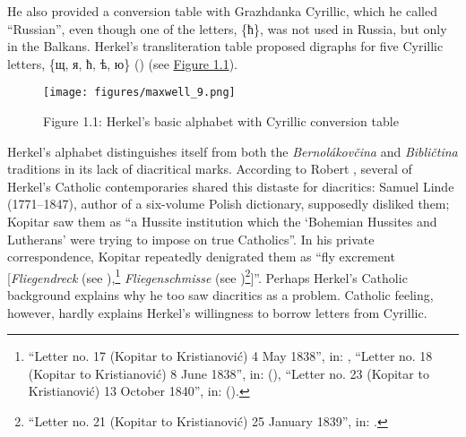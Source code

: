 He also provided a conversion table with Grazhdanka Cyrillic, which he called “Russian”, even though one of the letters, \{ћ\}, was not used in Russia, but only in the Balkans. Herkel’s transliteration table proposed digraphs for five Cyrillic letters, \{щ, я, ћ, ѣ, ю\} (\citeyear[164]{herkel_elementa_1826}) (see \hyperref[fig:Figure 1.1]{Figure 1.1}).

\begin{figure}
    \centering
    \caption*{Figure 1.1: Herkel’s basic alphabet with Cyrillic conversion table}
    \label{fig:Figure 1.1}
    \texttt{[image: figures/maxwell\_9.png]}
\end{figure}

Herkel’s alphabet distinguishes itself from both the \textit{Bernolákovčina} and \textit{Bibličtina} traditions in its lack of diacritical marks. According to Robert \citet[327--328]{auty_orthographical_1968}, several of Herkel’s Catholic contemporaries shared this distaste for dia\-critics: Samuel Linde (1771--1847), author of a six-volume Polish dictionary, supposedly disliked them; Kopitar saw them as “a Hussite institution which the ‘Bohemian Hussites and Lutherans’ were trying to impose on true Catholics”. In his private correspondence, Kopitar repeatedly denigrated them as “fly excrement [\textit{Fliegendreck} (see \cite[96, 99, 107]{sakcinski_arkiv_1875}),\footnote{“Letter no. 17 (Kopitar to Kristianović) 4 May 1838”, in: \citet[96]{sakcinski_arkiv_1875}, “Letter no. 18 (Kopitar to Kristianović) 8 June 1838”, in: (\citeyear[99]{sakcinski_arkiv_1875}), “Letter no. 23 (Kopitar to Kristianović) 13 October 1840”, in: (\citeyear[107]{sakcinski_arkiv_1875}).} \textit{Fliegenschmisse} (see \citeyear[104, 105]{sakcinski_arkiv_1875})\footnote{“Letter no. 21 (Kopitar to Kristianović) 25 January 1839”, in: \citet[104, 105]{sakcinski_arkiv_1875}.}]”. Perhaps Herkel’s Catholic background explains why he too saw diacritics as a problem. Catholic feeling, however, hardly explains Herkel’s willingness to borrow letters from Cyrillic.

